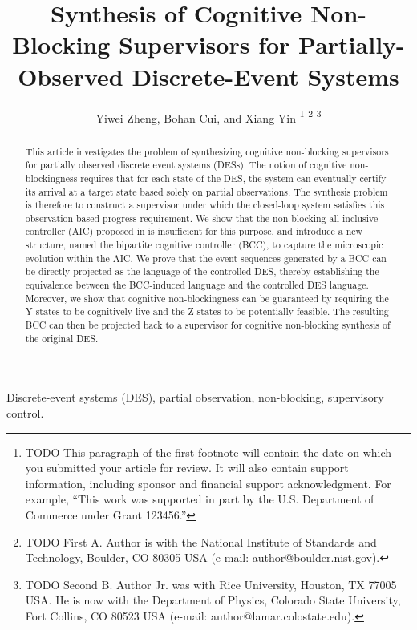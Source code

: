 \documentclass[journal,twoside,web]{ieeecolor}
\begin{document}
\title{Synthesis of Cognitive Non-Blocking Supervisors for Partially-Observed Discrete-Event Systems}
\author{Yiwei Zheng, Bohan Cui, and Xiang Yin
\thanks{TODO This paragraph of the first footnote will contain the date on 
which you submitted your article for review. It will also contain support 
information, including sponsor and financial support acknowledgment. For 
example, ``This work was supported in part by the U.S. Department of 
Commerce under Grant 123456.'' }
\thanks{TODO First A. Author is with the National Institute of Standards and 
Technology, Boulder, CO 80305 USA (e-mail: author@boulder.nist.gov). }
\thanks{TODO Second B. Author Jr. was with Rice University, Houston, TX 77005 USA. He is 
now with the Department of Physics, Colorado State University, Fort Collins, 
CO 80523 USA (e-mail: author@lamar.colostate.edu).}}

\maketitle

\begin{abstract}
This article investigates the problem of synthesizing cognitive non-blocking supervisors for partially observed discrete event systems (DESs).
The notion of cognitive non-blockingness requires that for each state of the DES, the system can eventually certify its arrival at a target state based solely on partial observations.
The synthesis problem is therefore to construct a supervisor under which the closed-loop system satisfies this observation-based progress requirement.
%
We show that the non-blocking all-inclusive controller (AIC) proposed in \cite{yin2016synthesis} is insufficient for this purpose, and introduce a new structure, named the bipartite cognitive controller (BCC), to capture the microscopic evolution within the AIC.
We prove that the event sequences generated by a BCC can be directly projected as the language of the controlled DES, thereby establishing the equivalence between the BCC-induced language and the controlled DES language.
Moreover, we show that cognitive non-blockingness can be guaranteed by requiring the Y-states to be cognitively live and the Z-states to be potentially feasible.
The resulting BCC can then be projected back to a supervisor for cognitive non-blocking synthesis of the original DES.
\end{abstract}

\begin{IEEEkeywords}
Discrete-event systems (DES), partial observation, non-blocking, supervisory control. %
\end{IEEEkeywords}
\end{document}
